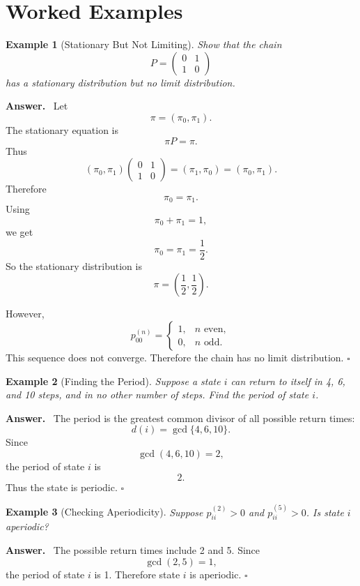 \documentclass[12pt,a4paper]{article}
\theoremstyle{lecturestyle}
\newtheorem{example}{Example}
\newenvironment{answer}
{\par\textbf{Answer.}\ }
{\hfill$\square$\par}
\begin{document}
\section{Worked Examples}

\begin{example}[Stationary But Not Limiting]
Show that the chain
\[
P=
\begin{pmatrix}
0 & 1\\
1 & 0
\end{pmatrix}
\]
has a stationary distribution but no limit distribution.
\end{example}

\begin{answer}
Let
\[
\pi=(\pi_0,\pi_1).
\]
The stationary equation is
\[
\pi P=\pi.
\]
Thus
\[
(\pi_0,\pi_1)
\begin{pmatrix}
0 & 1\\
1 & 0
\end{pmatrix}
=
(\pi_1,\pi_0)
=
(\pi_0,\pi_1).
\]
Therefore
\[
\pi_0=\pi_1.
\]
Using
\[
\pi_0+\pi_1=1,
\]
we get
\[
\pi_0=\pi_1=\frac12.
\]
So the stationary distribution is
\[
\pi=\left(\frac12,\frac12\right).
\]

However,
\[
p_{00}^{(n)}
=
\begin{cases}
1, & n\text{ even},\\
0, & n\text{ odd}.
\end{cases}
\]
This sequence does not converge. Therefore the chain has no limit distribution.
\end{answer}

\begin{example}[Finding the Period]
Suppose a state $i$ can return to itself in 4, 6, and 10 steps, and in no other number of steps. Find the period of state $i$.
\end{example}

\begin{answer}
The period is the greatest common divisor of all possible return times:
\[
d(i)=\gcd\{4,6,10\}.
\]
Since
\[
\gcd(4,6,10)=2,
\]
the period of state $i$ is
\[
\boxed{2.}
\]
Thus the state is periodic.
\end{answer}

\begin{example}[Checking Aperiodicity]
Suppose $p_{ii}^{(2)}>0$ and $p_{ii}^{(5)}>0$. Is state $i$ aperiodic?
\end{example}

\begin{answer}
The possible return times include 2 and 5. Since
\[
\gcd(2,5)=1,
\]
the period of state $i$ is 1. Therefore state $i$ is aperiodic.
\end{answer}
\end{document}
